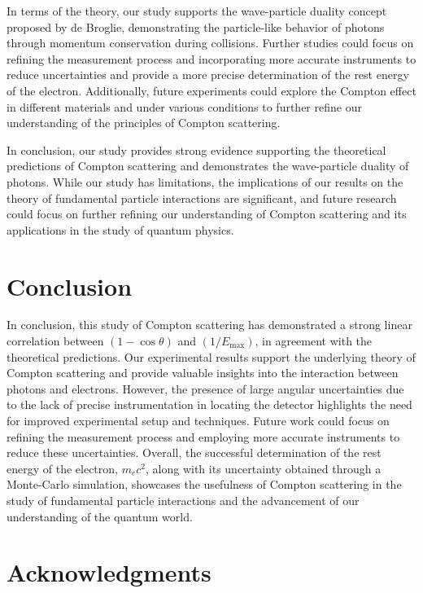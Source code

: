 In terms of the theory, our study supports the wave-particle duality concept proposed by de Broglie, demonstrating the particle-like behavior of photons through momentum conservation during collisions. Further studies could focus on refining the measurement process and incorporating more accurate instruments to reduce uncertainties and provide a more precise determination of the rest energy of the electron. Additionally, future experiments could explore the Compton effect in different materials and under various conditions to further refine our understanding of the principles of Compton scattering.

In conclusion, our study provides strong evidence supporting the theoretical predictions of Compton scattering and demonstrates the wave-particle duality of photons. While our study has limitations, the implications of our results on the theory of fundamental particle interactions are significant, and future research could focus on further refining our understanding of Compton scattering and its applications in the study of quantum physics.

\section{Conclusion}

In conclusion, this study of Compton scattering has demonstrated a strong linear correlation between $(1 - \cos\theta)$ and $(1/E_{\max})$, in agreement with the theoretical predictions. Our experimental results support the underlying theory of Compton scattering and provide valuable insights into the interaction between photons and electrons. However, the presence of large angular uncertainties due to the lack of precise instrumentation in locating the detector highlights the need for improved experimental setup and techniques. Future work could focus on refining the measurement process and employing more accurate instruments to reduce these uncertainties. Overall, the successful determination of the rest energy of the electron, $m_ec^2$, along with its uncertainty obtained through a Monte-Carlo simulation, showcases the usefulness of Compton scattering in the study of fundamental particle interactions and the advancement of our understanding of the quantum world.

\section{Acknowledgments}

